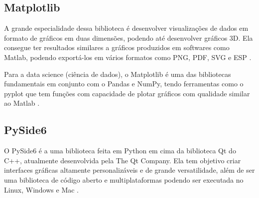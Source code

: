 \subsection{Matplotlib}

A grande especialidade dessa biblioteca é desenvolver visualizações de dados em formato de gráficos em duas dimensões, podendo até desenvolver gráficos 3D. Ela consegue ter resultados similares a gráficos produzidos em softwares como Matlab, podendo exportá-los em vários formatos como PNG, PDF, SVG e ESP \cite{ref:nelli_2023}.

Para a data science (ciência de dados), o Matplotlib é uma das bibliotecas fundamentais em conjunto com o Pandas e NumPy, tendo ferramentas como o pyplot que tem funções com capacidade de plotar gráficos com qualidade similar ao Matlab \cite{ref:bisong_2019}.

\subsection{PySide6}

O PySide6 é a uma biblioteca feita em Python em cima da biblioteca Qt do C++, atualmente desenvolvida pela The Qt Company. Ela tem objetivo criar interfaces gráficas altamente personalizáveis e de grande versatilidade, além de ser uma biblioteca de código aberto e multiplataformas podendo ser executada no Linux, Windows e Mac \cite{ref:fitzpatrick_2022}.
